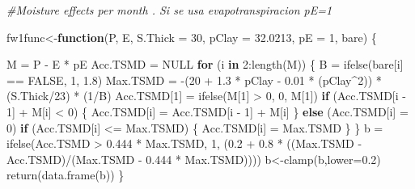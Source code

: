\documentclass[
  10pt,
  b5paper,
]{book}
\newenvironment{Shaded}{\begin{snugshade}}{\end{snugshade}}
\newcommand{\AttributeTok}[1]{\textcolor[rgb]{0.77,0.63,0.00}{#1}}
\newcommand{\CommentTok}[1]{\textcolor[rgb]{0.56,0.35,0.01}{\textit{#1}}}
\newcommand{\ConstantTok}[1]{\textcolor[rgb]{0.00,0.00,0.00}{#1}}
\newcommand{\ControlFlowTok}[1]{\textcolor[rgb]{0.13,0.29,0.53}{\textbf{#1}}}
\newcommand{\DecValTok}[1]{\textcolor[rgb]{0.00,0.00,0.81}{#1}}
\newcommand{\FloatTok}[1]{\textcolor[rgb]{0.00,0.00,0.81}{#1}}
\newcommand{\FunctionTok}[1]{\textcolor[rgb]{0.00,0.00,0.00}{#1}}
\newcommand{\NormalTok}[1]{#1}
\newcommand{\OtherTok}[1]{\textcolor[rgb]{0.56,0.35,0.01}{#1}}
\newcommand{\SpecialCharTok}[1]{\textcolor[rgb]{0.00,0.00,0.00}{#1}}
\begin{document}
\begin{Shaded}
\begin{Highlighting}[]
\CommentTok{\#Moisture effects per month . Si se usa evapotranspiracion pE=1}

\NormalTok{fw1func}\OtherTok{\textless{}{-}}\ControlFlowTok{function}\NormalTok{(P, E, }\AttributeTok{S.Thick =} \DecValTok{30}\NormalTok{, }\AttributeTok{pClay =} \FloatTok{32.0213}\NormalTok{, }\AttributeTok{pE =} \DecValTok{1}\NormalTok{, bare) }
\NormalTok{\{}
   
\NormalTok{    M }\OtherTok{=}\NormalTok{ P }\SpecialCharTok{{-}}\NormalTok{ E }\SpecialCharTok{*}\NormalTok{ pE}
\NormalTok{    Acc.TSMD }\OtherTok{=} \ConstantTok{NULL}
    \ControlFlowTok{for}\NormalTok{ (i }\ControlFlowTok{in} \DecValTok{2}\SpecialCharTok{:}\FunctionTok{length}\NormalTok{(M)) \{}
\NormalTok{    B }\OtherTok{=} \FunctionTok{ifelse}\NormalTok{(bare[i] }\SpecialCharTok{==} \ConstantTok{FALSE}\NormalTok{, }\DecValTok{1}\NormalTok{, }\FloatTok{1.8}\NormalTok{)}
\NormalTok{     Max.TSMD }\OtherTok{=} \SpecialCharTok{{-}}\NormalTok{(}\DecValTok{20} \SpecialCharTok{+} \FloatTok{1.3} \SpecialCharTok{*}\NormalTok{ pClay }\SpecialCharTok{{-}} \FloatTok{0.01} \SpecialCharTok{*}\NormalTok{ (pClay}\SpecialCharTok{\^{}}\DecValTok{2}\NormalTok{)) }\SpecialCharTok{*}\NormalTok{ (S.Thick}\SpecialCharTok{/}\DecValTok{23}\NormalTok{) }\SpecialCharTok{*}\NormalTok{ (}\DecValTok{1}\SpecialCharTok{/}\NormalTok{B)}
\NormalTok{        Acc.TSMD[}\DecValTok{1}\NormalTok{] }\OtherTok{=} \FunctionTok{ifelse}\NormalTok{(M[}\DecValTok{1}\NormalTok{] }\SpecialCharTok{\textgreater{}} \DecValTok{0}\NormalTok{, }\DecValTok{0}\NormalTok{, M[}\DecValTok{1}\NormalTok{])}
        \ControlFlowTok{if}\NormalTok{ (Acc.TSMD[i }\SpecialCharTok{{-}} \DecValTok{1}\NormalTok{] }\SpecialCharTok{+}\NormalTok{ M[i] }\SpecialCharTok{\textless{}} \DecValTok{0}\NormalTok{) \{}
\NormalTok{            Acc.TSMD[i] }\OtherTok{=}\NormalTok{ Acc.TSMD[i }\SpecialCharTok{{-}} \DecValTok{1}\NormalTok{] }\SpecialCharTok{+}\NormalTok{ M[i]}
\NormalTok{        \}}
        \ControlFlowTok{else}\NormalTok{ (Acc.TSMD[i] }\OtherTok{=} \DecValTok{0}\NormalTok{)}
        \ControlFlowTok{if}\NormalTok{ (Acc.TSMD[i] }\SpecialCharTok{\textless{}=}\NormalTok{ Max.TSMD) \{}
\NormalTok{            Acc.TSMD[i] }\OtherTok{=}\NormalTok{ Max.TSMD}
\NormalTok{        \}}
\NormalTok{    \}}
\NormalTok{    b }\OtherTok{=} \FunctionTok{ifelse}\NormalTok{(Acc.TSMD }\SpecialCharTok{\textgreater{}} \FloatTok{0.444} \SpecialCharTok{*}\NormalTok{ Max.TSMD, }\DecValTok{1}\NormalTok{, (}\FloatTok{0.2} \SpecialCharTok{+} \FloatTok{0.8} \SpecialCharTok{*}\NormalTok{ ((Max.TSMD }\SpecialCharTok{{-}} 
\NormalTok{        Acc.TSMD)}\SpecialCharTok{/}\NormalTok{(Max.TSMD }\SpecialCharTok{{-}} \FloatTok{0.444} \SpecialCharTok{*}\NormalTok{ Max.TSMD))))}
\NormalTok{    b}\OtherTok{\textless{}{-}}\FunctionTok{clamp}\NormalTok{(b,}\AttributeTok{lower=}\FloatTok{0.2}\NormalTok{)}
    \FunctionTok{return}\NormalTok{(}\FunctionTok{data.frame}\NormalTok{(b))}
\NormalTok{\}}



\end{Highlighting}
\end{Shaded}
\end{document}
